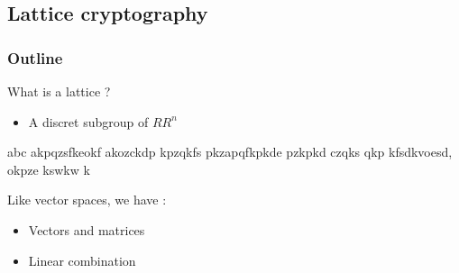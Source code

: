 \documentclass{beamer}
\begin{document}
\subsection{Lattice cryptography}
\begin{frame}
  \frametitle{Outline}
\end{frame}

\begin{frame}{What is a lattice ?}
	\begin{linenumbers}
		\begin{itemize}
			\item A discret subgroup of $RR^n$
		\end{itemize}

		abc akpqzsfkeokf  akozckdp kpzqkfs pkzapqfkpkde pzkpkd czqks qkp kfsdkvoesd, okpze kswkw k
	\end{linenumbers}

	Like vector spaces, we have :
	\begin{itemize}
		\item Vectors and matrices
		\item Linear combination
	\end{itemize}
\end{frame}
\end{document}
